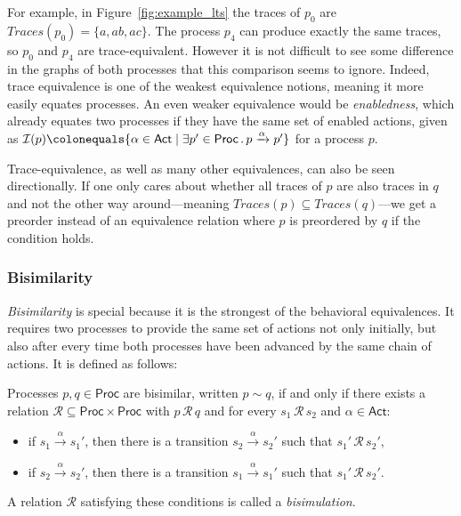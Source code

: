 For example, in Figure~\ref{fig:example_lts} the traces of $p_0$ are
$Traces(p_0) = \{a, ab, ac\}$.
The process $p_4$ can produce exactly the same traces,
so $p_0$ and $p_4$ are trace-equivalent.
However it is not difficult to see some difference in the graphs of both
processes that this comparison seems to ignore.
Indeed, trace equivalence is one of the weakest equivalence notions,
meaning it more easily equates processes.
An even weaker equivalence would be \emph{enabledness},
which already equates two processes
if they have the same set of enabled actions,
given as
$\mathcal{I}(p) \colonequals \{\alpha \in \mathsf{Act} \mid
    {\exists p' \in \mathsf{Proc}}\,.\,p \xrightarrow{\alpha} p'\}$
for a process $p$.

Trace-equivalence, as well as many other equivalences,
can also be seen directionally.
If one only cares about whether all traces of $p$ are also traces in $q$ and
not the other way around---meaning $Traces(p) \subseteq Traces(q)$---we get a
preorder instead of an equivalence relation where $p$ is preordered by $q$
if the condition holds.


\subsubsection{Bisimilarity}

\emph{Bisimilarity} is special because it is the strongest of the behavioral
equivalences.
It requires two processes to provide the same set of actions not only initially,
but also after every time both processes have been advanced
by the same chain of actions.
It is defined as follows:

\begin{definition}\label{def:bisimulation}
    Processes $p, q \in \mathsf{Proc}$ are bisimilar, written $p \sim q$,
    if and only if there exists a relation
    $\mathcal{R} \subseteq \mathsf{Proc} \times \mathsf{Proc}$
    with $p\, \mathcal{R}\, q$ and for every $s_1\, \mathcal{R}\, s_2$ and
    $\alpha \in \mathsf{Act}$:
    \begin{itemize}
        \item if $s_1 \xrightarrow{\alpha} s_1'$, then there is a transition
            $s_2 \xrightarrow{\alpha} s_2'$ such that $s_1'\, \mathcal{R}\, s_2'$,
        \item if $s_2 \xrightarrow{\alpha} s_2'$, then there is a transition
            $s_1 \xrightarrow{\alpha} s_1'$ such that $s_1'\, \mathcal{R}\, s_2'$.
    \end{itemize}
    A relation $\mathcal{R}$ satisfying these conditions is called a
    \emph{bisimulation}.
\end{definition}


